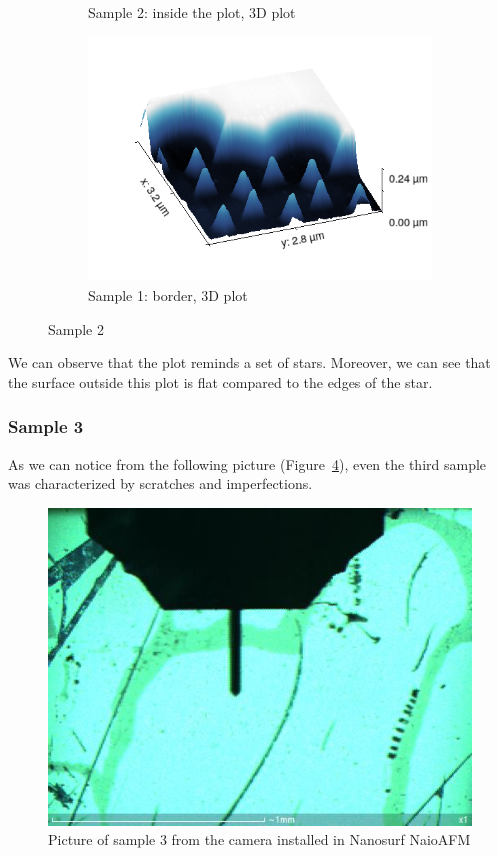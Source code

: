\documentclass[11pt,a4paper]{article}
\begin{document}
\begin{figure}[H]
\begin{subfigure}[b]{0.45\textwidth}
\caption{Sample 2: inside the plot, 3D plot}
\label{fig:}
\end{subfigure}
\begin{subfigure}[b]{0.45\textwidth}
\includegraphics[width=\textwidth]{sm_sample2_border_3D}
\caption{Sample 1: border, 3D plot}
\label{fig:}
\end{subfigure}
\caption{Sample 2}
\end{figure}

We can observe that the plot reminds a set of stars. Moreover, we can see that the surface outside this plot is flat compared to the edges of the star.

\subsubsection{Sample 3}
As we can notice from the following picture (Figure~\ref{fig:sample3_set}), even the third sample was characterized by scratches and imperfections.

\begin{figure}[ht]
\centering
\includegraphics[scale=0.4]{sm_sample3_set}
\caption{Picture of sample 3 from the camera installed in Nanosurf NaioAFM}
\label{fig:sample3_set}
\end{figure}
\end{document}
